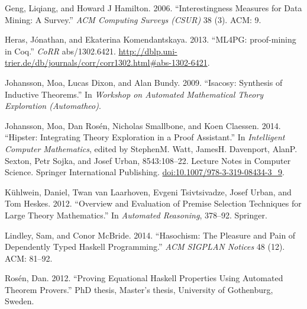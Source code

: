 \documentclass[]{article}
\begin{document}
Geng, Liqiang, and Howard J Hamilton. 2006. ``Interestingness Measures
for Data Mining: A Survey.'' \emph{ACM Computing Surveys (CSUR)} 38 (3).
ACM: 9.

Heras, Jónathan, and Ekaterina Komendantskaya. 2013. ``ML4PG:
proof-mining in Coq.'' \emph{CoRR} abs/1302.6421.
\url{http://dblp.uni-trier.de/db/journals/corr/corr1302.html\#abs-1302-6421}.

Johansson, Moa, Lucas Dixon, and Alan Bundy. 2009. ``Isacosy: Synthesis
of Inductive Theorems.'' In \emph{Workshop on Automated Mathematical
Theory Exploration (Automatheo)}.

Johansson, Moa, Dan Rosén, Nicholas Smallbone, and Koen Claessen. 2014.
``Hipster: Integrating Theory Exploration in a Proof Assistant.'' In
\emph{Intelligent Computer Mathematics}, edited by StephenM. Watt,
JamesH. Davenport, AlanP. Sexton, Petr Sojka, and Josef Urban,
8543:108--22. Lecture Notes in Computer Science. Springer International
Publishing.
\href{http://doi.org/10.1007/978-3-319-08434-3_9}{doi:10.1007/978-3-319-08434-3\_9}.

Kühlwein, Daniel, Twan van Laarhoven, Evgeni Tsivtsivadze, Josef Urban,
and Tom Heskes. 2012. ``Overview and Evaluation of Premise Selection
Techniques for Large Theory Mathematics.'' In \emph{Automated
Reasoning}, 378--92. Springer.

Lindley, Sam, and Conor McBride. 2014. ``Hasochism: The Pleasure and
Pain of Dependently Typed Haskell Programming.'' \emph{ACM SIGPLAN
Notices} 48 (12). ACM: 81--92.

Rosén, Dan. 2012. ``Proving Equational Haskell Properties Using
Automated Theorem Provers.'' PhD thesis, Master's thesis, University of
Gothenburg, Sweden.
\end{document}
